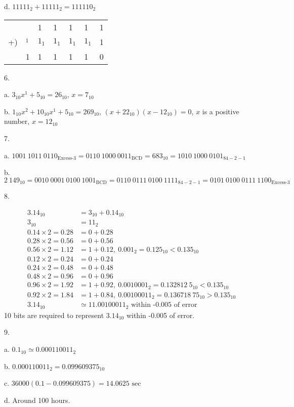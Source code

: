 \documentclass[UTF8,12pt,letterpaper,oneside]{amsart}
\begin{document}
d. $11111_2 + 11111_2 = 111110_2$

\begin{tabular}{lllllll}
   &   & 1 & 1      & 1   & 1 & 1\\
+) & ${}_1$  & $1_1$ & $1_1$  & $1_1$ & $1_1$ & 1\\\hline
   & 1 & 1 & 1      & 1   & 1 & 0
\end{tabular}

6.

a. $3_{10} x^1 + 5_{10} = 26_{10}$, $x = 7_{10}$

b. $1_{10} x^2 + 10_{10} x^1 + 5_{10} = 269_{10}$, $(x + 22_{10})(x - 12_{10}) = 0$, $x$ is a positive number, $x = 12_{10}$

7.

a. $1001\ 1011\ 0110_{\text{Excess-3}} = 0110\ 1000\ 0011_{\text{BCD}} = 683_{10} = 1010\ 1000\ 0101_{84-2-1}$

b. $2\ 149_{10} = 0010\ 0001\ 0100\ 1001_{\text{BCD}} = 0110\ 0111\ 0100\ 1111_{84-2-1} = 0101\ 0100\ 0111\ 1100_{\text{Excess-3}}$

8.

\begin{equation*}\begin{split}
3.14_{10}   &= 3_{10} + 0.14_{10}\\
3_{10} &= 11_2\\
0.14 \times 2 = 0.28 &= 0 + 0.28\\
0.28 \times 2 = 0.56 &= 0 + 0.56\\
0.56 \times 2 = 1.12 &= 1 + 0.12,\ 0.001_2 = 0.125_{10} < 0.135_{10}\\
0.12 \times 2 = 0.24 &= 0 + 0.24\\
0.24 \times 2 = 0.48 &= 0 + 0.48\\
0.48 \times 2 = 0.96 &= 0 + 0.96\\
0.96 \times 2 = 1.92 &= 1 + 0.92,\ 0.0010001_2 = 0.132812\ 5_{10} < 0.135_{10}\\
0.92 \times 2 = 1.84 &= 1 + 0.84,\ 0.00100011_2 = 0.136718\ 75_{10} > 0.135_{10}\\
3.14_{10} &\simeq 11.00100011_2\text{ within -0.005 of error}
\end{split}\end{equation*}
10 bits are required to represent $3.14_{10}$ within -0.005 of error.

9.

a. $0.1_{10} \simeq 0.000110011_2$

b. $0.000110011_2 = 0.099609375_{10}$

c. $36000(0.1 - 0.099609375) = 14.0625\text{ sec}$

d. Around 100 hours.
\end{document}
